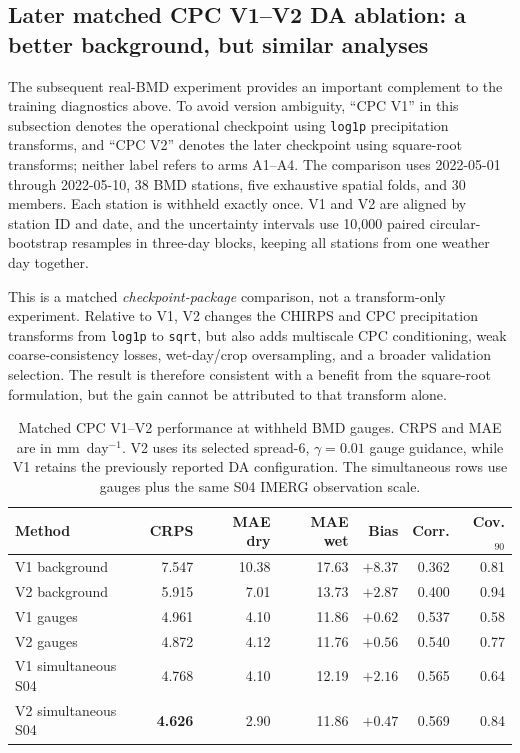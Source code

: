 \subsection{Later matched CPC V1--V2 DA ablation: a better background, but
similar analyses}
\label{sec:ablation-v1-v2-da}

The subsequent real-BMD experiment provides an important complement to the
training diagnostics above. To avoid version ambiguity, ``CPC V1'' in this
subsection denotes the operational checkpoint using \texttt{log1p}
precipitation transforms, and ``CPC V2'' denotes the later checkpoint using
square-root transforms; neither label refers to arms A1--A4. The comparison
uses 2022-05-01 through 2022-05-10, 38 BMD stations, five exhaustive spatial
folds, and 30 members. Each station is withheld exactly once. V1 and V2 are
aligned by station ID and date, and the uncertainty intervals use 10,000
paired circular-bootstrap resamples in three-day blocks, keeping all stations
from one weather day together.

This is a matched \emph{checkpoint-package} comparison, not a transform-only
experiment. Relative to V1, V2 changes the CHIRPS and CPC precipitation
transforms from \texttt{log1p} to \texttt{sqrt}, but also adds multiscale CPC
conditioning, weak coarse-consistency losses, wet-day/crop oversampling, and a
broader validation selection. The result is therefore consistent with a
benefit from the square-root formulation, but the gain cannot be attributed to
that transform alone.

\begin{table}[htbp]
\centering
\caption{Matched CPC V1--V2 performance at withheld BMD gauges. CRPS and MAE
are in mm~day$^{-1}$. V2 uses its selected spread-6, $\gamma=0.01$ gauge
guidance, while V1 retains the previously reported DA configuration. The
simultaneous rows use gauges plus the same S04 IMERG observation scale.}
\label{tab:ablation-v1-v2-da}
\small
\begin{tabular}{lrrrrrr}
\hline
Method & CRPS & MAE dry & MAE wet & Bias & Corr. & Cov.$_{90}$ \\
\hline
V1 background          & 7.547 & 10.38 & 17.63 & $+8.37$ & 0.362 & 0.81 \\
V2 background          & 5.915 &  7.01 & 13.73 & $+2.87$ & 0.400 & 0.94 \\
\hline
V1 gauges              & 4.961 &  4.10 & 11.86 & $+0.62$ & 0.537 & 0.58 \\
V2 gauges              & 4.872 &  4.12 & 11.76 & $+0.56$ & 0.540 & 0.77 \\
\hline
V1 simultaneous S04    & 4.768 &  4.10 & 12.19 & $+2.16$ & 0.565 & 0.64 \\
V2 simultaneous S04    & \textbf{4.626} & 2.90 & 11.86 & $+0.47$ & 0.569 & 0.84 \\
\hline
\end{tabular}
\end{table}

